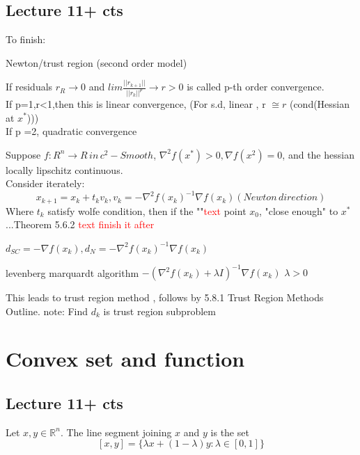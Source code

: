 \subsection{Lecture 11+ cts}
To finish:

Newton/trust region (second order model)

\begin{definition}
    If residuals $r_R\to 0$ and 
    $lim\frac{||r_{k+1}||}{||r_k||^p}\to r >0$ is called p-th order convergence.
    \\ If p=1,r<1,then this is linear convergence, (For s.d, linear , r $\cong r$ (cond(Hessian at $x^*$)))
    \\ If p =2, quadratic convergence
\end{definition}

\begin{theorem}
    Suppose $f:R^n\to R\,in\, c^2-Smooth$, $\nabla^2f(x^*)>0,\nabla f(x^2)=0$, and 
    the hessian locally lipschitz continuous.\\
    Consider iterately:
    $$x_{k+1}=x_k+t_kv_k,v_k=-\nabla^2f(x_k)^{-1}\nabla f(x_k)(Newton\,direction)$$
    Where $t_k$ satisfy wolfe condition, then  if the ""\textcolor{red}{text} point $x_0$,
    "close enough" to $x^*$ ...Theorem 5.6.2 \textcolor{red}{text finish it after}
\end{theorem}
\begin{problem}
    $d_{SC}=-\nabla f(x_k),d_N=-\nabla^2f(x_k)^{-1}\nabla f(x_k) $
\end{problem}

    levenberg marquardt algorithm
$-(\nabla^2 f(x_k)+\lambda I)^{-1}\nabla f(x_k)$ $\lambda >0$
\begin{problem}
    This leads to trust region method ,
    follows by 5.8.1 Trust Region Methods Outline.
    note: Find $d_k$ is trust region subproblem
\end{problem}


\section{Convex set and function}
\subsection{Lecture 11+ cts}
\begin{definition}
    Let $x,y \in \mathbb R^n$. The line segment joining $x$ and $y$ is the set
    $$[x,y] = \{\lambda x + (1 - \lambda)y : \lambda \in [0,1]\}$$
\end{definition}

